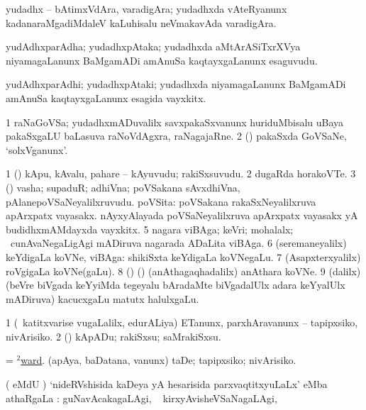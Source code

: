 \bentry
{} 
\gl{\nA}
\expl{}
\bmng
yudadhx -- bAtimxVdAra, varadigAra; yudadhxda vAteRyanunx kadanaraMgadiMdaleV kaLuhisalu neVmakavAda varadigAra. 
\emng
\eentry

\bentry
{} 
\gl{\nA}
\expl{}
\bmng
yudAdhxparAdha; yudadhxpAtaka; yudadhxda aMtArASiTxrXVya niyamagaLanunx BaMgamADi amAnuSa kaqtayxgaLanunx esaguvudu. 
\emng
\eentry

\bentry
{} 
\gl{\nA}
\expl{}
\bmng
yudAdhxparAdhi; yudadhxpAtaki; yudadhxda niyamagaLanunx BaMgamADi amAnuSa kaqtayxgaLanunx esagida vayxkitx. 
\emng
\eentry

\bentry
{} 
\gl{\nA}
\expl{}
\bmng
\bnum
\num{1} raNaGoVSa; yudadhxmADuvalilx savxpakaSxvanunx huriduMbisalu uBaya pakaSxgaLU baLasuva raNoVdAgxra, raNagajaRne. 
\num{2} (\rUpa) pakaSxda GoVSaNe, `solxVganunx'. 
\enum
\emng
\eentry

\bentry
{} 
\gl{\nA}
\expl{}
\bmng
\bnum
\num{1} (\pArxparx) kApu, kAvalu, pahare -- kAyuvudu; rakiSxsuvudu. 
\num{2} dugaRda horakoVTe. 
\num{3} (\pArxparx) vasha; supaduR; adhiVna; poVSakana sAvxdhiVna, pAlanepoVSaNeyalilxruvudu. 
 poVSita: 
\banum
{} poVSakana rakaSxNeyalilxruva apArxpatx vayasakx. 
 nAyxyAlayada poVSaNeyalilxruva apArxpatx vayasakx yA budidhxmAMdayxda vayxkitx. 
\eanum
\numie
\num{5} nagara viBAga; keVri; mohalalx; \kanmu\ cunAvaNegaLigAgi mADiruva nagarada ADaLita viBAga. 
\num{6} (seremaneyalilx) keYdigaLa koVNe, viBAga:  shikiSxta keYdigaLa koVNegaLu. 
\num{7} (Asapxterxyalilx) roVgigaLa koVNe(gaLu). 
\num{8} (\ca) (\birx) (anAthagaqhadalilx) anAthara koVNe. 
\num{9} (\bava dalilx) (beVre biVgada keYyiMda tegeyalu bAradaMte biVgadalUlx adara keYyalUlx mADiruva) kacucxgaLu matutx halulxgaLu. 
\enum
\emng
\eentry

\bentry
{} 
\gl{\sakirx}
\expl{}
\bmng
\bnum
\num{1} (\kanmu\ katitxvarise \mo vugaLalilx, edurALiya) ETanunx, parxhAravanunx -- tapipxsiko, nivArisiko. 
\num{2} (\pArxparx) kApADu; rakiSxsu; saMrakiSxsu. 
\enum
\emng

\noindent 
\gl{\pagu}
\expl{}
\bmng
{} 
\banum
{} = \hyperlink{ward(2)}{$^2$ward}. 
 (apAya, baDatana, \mo vanunx) taDe; tapipxsiko; nivArisiko. 
\eanum
\emng
\eentry

\bentry
{} 
\gl{\uparx}
\expl{}
\bmng
( eMdU \parx) `nideRVshisida kaDeya yA hesarisida parxvaqtitxyuLaLx' eMba athaRgaLa \uparx : 
\banum
{} guNavAcakagaLAgi, \udA\  
 kirxyAvisheVSaNagaLAgi, \udA\  
\eanum
\emng
\eentry

